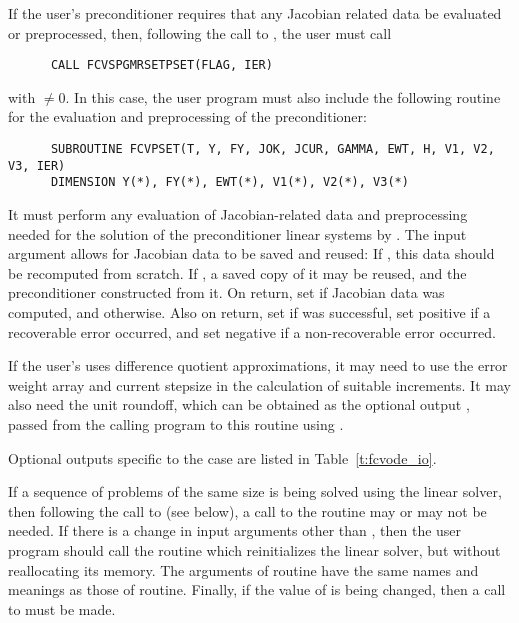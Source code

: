 \begin{Steps}
  If the user's preconditioner requires that any Jacobian related data be evaluated
  or preprocessed, then, following the call to , the user must
  call 
\begin{verbatim}
      CALL FCVSPGMRSETPSET(FLAG, IER)
\end{verbatim}
  with $\neq 0$.
  In this case, the user program must also include
  the following routine for the evaluation and preprocessing of the preconditioner:
\begin{verbatim}
      SUBROUTINE FCVPSET(T, Y, FY, JOK, JCUR, GAMMA, EWT, H, V1, V2, V3, IER)
      DIMENSION Y(*), FY(*), EWT(*), V1(*), V2(*), V3(*) 
\end{verbatim}
  It must perform any evaluation of Jacobian-related data and preprocessing needed
  for the solution of the preconditioner linear systems by .
  The input argument  allows for Jacobian data to be saved and reused:
  If , this data should be recomputed from scratch. If ,
  a saved copy of it may be reused, and the preconditioner constructed from it.
  On return, set  if Jacobian data was computed, and  otherwise.
  Also on return, set  if  was successful, set 
  positive if a recoverable error occurred, and set  negative if a 
  non-recoverable error occurred.
  
  If the user's  uses difference quotient approximations, it
  may need to use the error weight array  and current stepsize 
  in the calculation of suitable increments.  It may also need the unit
  roundoff, which can be obtained as the optional output ,
  passed from the calling program to this routine using .

  Optional outputs specific to the {\spgmr} case are listed in Table~\ref{t:fcvode_io}.
  
  If a sequence of problems of the same size is being solved using the {\spgmr}
  linear solver, then following the call to  (see below), a call
  to the  routine may or may not be needed.  
  If there is a change in input arguments other than , then the user 
  program should call the routine  which
  reinitializes the {\spgmr} linear solver, but without reallocating its memory.
  The arguments of  routine have the same names and meanings
  as those of  routine.  Finally, if the value of  is
  being changed, then a call to  must be made.


\end{Steps}
